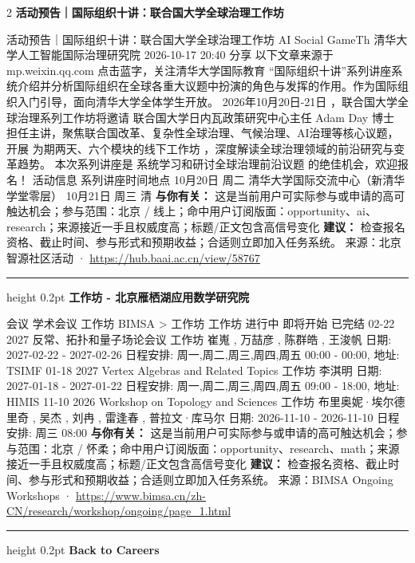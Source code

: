 \documentclass[10.5pt]{ctexart}
\begin{document}
\begin{multicols}{2}
{\large\bfseries 活动预告｜国际组织十讲：联合国大学全球治理工作坊}\par
活动预告｜国际组织十讲：联合国大学全球治理工作坊 AI Social GameTh 清华大学人工智能国际治理研究院 2026-10-17 20:40 分享 以下文章来源于mp.weixin.qq.com 点击蓝字，关注清华大学国际教育 “国际组织十讲”系列讲座系统介绍并分析国际组织在全球各重大议题中扮演的角色与发挥的作用。作为国际组织入门引导，面向清华大学全体学生开放。 2026年10月20日-21日 ，联合国大学全球治理系列工作坊将邀请 联合国大学日内瓦政策研究中心主任 Adam Day 博士 担任主讲，聚焦联合国改革、复杂性全球治理、气候治理、AI治理等核心议题，开展 为期两天、六个模块的线下工作坊 ，深度解读全球治理领域的前沿研究与变革趋势。 本次系列讲座是 系统学习和研讨全球治理前沿议题 的绝佳机会，欢迎报名！ 活动信息 系列讲座时间地点 10月20日 周二 清华大学国际交流中心（新清华学堂零层） 10月21日 周三 清
\textbf{与你有关：} 这是当前用户可实际参与或申请的高可触达机会；参与范围：北京 / 线上；命中用户订阅版面：opportunity、ai、research；来源接近一手且权威度高；标题/正文包含高信号变化
\textbf{建议：} 检查报名资格、截止时间、参与形式和预期收益；合适则立即加入任务系统。
{\footnotesize\color{ormuted} 来源：北京智源社区活动 · \url{https://hub.baai.ac.cn/view/58767}}
\vspace{2mm}
\hrule height 0.2pt
\vspace{2mm}
{\large\bfseries 工作坊 - 北京雁栖湖应用数学研究院}\par
会议 学术会议 工作坊 BIMSA > 工作坊 工作坊 进行中 即将开始 已完结 02-22 2027 反常、拓扑和量子场论会议 工作坊 崔嵬 , 万喆彦 , 陈群皓 , 王浚帆 日期: 2027-02-22 - 2027-02-26 日程安排: 周一,周二,周三,周四,周五 00:00 - 00:00, 地址: TSIMF 01-18 2027 Vertex Algebras and Related Topics 工作坊 李淇明 日期: 2027-01-18 - 2027-01-22 日程安排: 周一,周二,周三,周四,周五 09:00 - 18:00, 地址: HIMIS 11-10 2026 Workshop on Topology and Sciences 工作坊 布里奥妮·埃尔德里奇 , 吴杰 , 刘冉 , 雷逢春 , 普拉文·库马尔 日期: 2026-11-10 - 2026-11-10 日程安排: 周三 08:00
\textbf{与你有关：} 这是当前用户可实际参与或申请的高可触达机会；参与范围：北京 / 怀柔；命中用户订阅版面：opportunity、research、math；来源接近一手且权威度高；标题/正文包含高信号变化
\textbf{建议：} 检查报名资格、截止时间、参与形式和预期收益；合适则立即加入任务系统。
{\footnotesize\color{ormuted} 来源：BIMSA Ongoing Workshops · \url{https://www.bimsa.cn/zh-CN/research/workshop/ongoing/page_1.html}}
\vspace{2mm}
\hrule height 0.2pt
\vspace{2mm}
{\large\bfseries Back to Careers}\par

\end{multicols}
\end{document}
